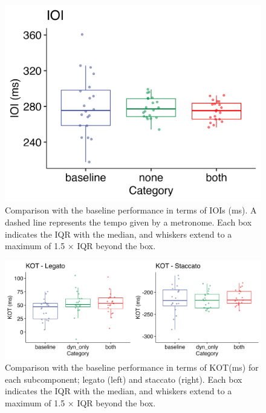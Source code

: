 \documentclass[
  man,floatsintext]{apa6}
\begin{document}
\begin{figure}
\includegraphics[width=1\linewidth]{manuscript_files/figure-latex/plot-ioi-2-1} \caption{\label{fig:ioi-2}Comparison with the baseline performance in terms of IOIs (ms). A dashed line represents the tempo given by a metronome. Each box indicates the IQR with the median, and whiskers extend to a maximum of 1.5 × IQR beyond the box.}\label{fig:plot-ioi-2}
\end{figure}

\begin{figure}
\includegraphics[width=1\linewidth]{manuscript_files/figure-latex/plot-kot-2-1} \caption{\label{fig:kot-2}Comparison with the baseline performance in terms of KOT(ms) for each subcomponent; legato (left) and staccato (right). Each box indicates the IQR with the median, and whiskers extend to a maximum of 1.5 × IQR beyond the box.}\label{fig:plot-kot-2}
\end{figure}
\end{document}
